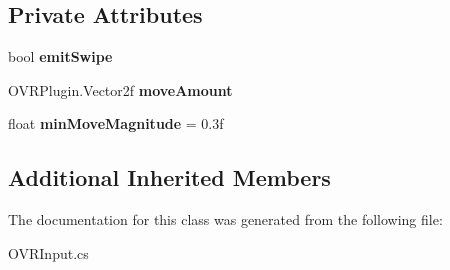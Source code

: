 \subsection*{Private Attributes}
\begin{DoxyCompactItemize}
\item 
\mbox{\label{class_o_v_r_input_1_1_o_v_r_controller_r_tracked_remote_acc1691808ba286328d4dc74e1bd01e91}} 
bool {\bfseries emit\+Swipe}
\item 
\mbox{\label{class_o_v_r_input_1_1_o_v_r_controller_r_tracked_remote_a9c14bc426a80aecb4872346629c7e075}} 
O\+V\+R\+Plugin.\+Vector2f {\bfseries move\+Amount}
\item 
\mbox{\label{class_o_v_r_input_1_1_o_v_r_controller_r_tracked_remote_a5e3ae7c7ed300887ee1be9f5309a2498}} 
float {\bfseries min\+Move\+Magnitude} = 0.\+3f
\end{DoxyCompactItemize}
\subsection*{Additional Inherited Members}


The documentation for this class was generated from the following file\+:\begin{DoxyCompactItemize}
\item 
O\+V\+R\+Input.\+cs\end{DoxyCompactItemize}
